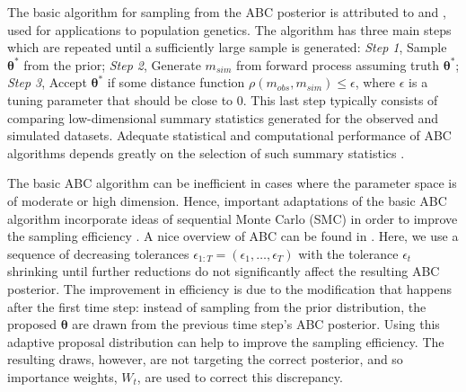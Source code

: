 \documentclass[12pt]{article}
\newcommand{\btheta}{\boldsymbol{\theta}}
\begin{document}
The basic algorithm for sampling from the ABC posterior is attributed to 
\cite{TavareEtAl1997} and \cite{PitchardEtAl1999}, used for applications to population 
genetics. The algorithm has three main steps which are repeated until a sufficiently
large sample is generated:
\emph{Step 1}, Sample $\btheta^*$ from the prior; \emph{Step 2}, 
Generate $m_{sim}$ from forward process assuming truth $\btheta^*$; 
 \emph{Step 3},  
Accept $\btheta^*$ if some distance function $\rho(m_{obs}, m_{sim}) \leq \epsilon$, where $\epsilon$ is a tuning parameter that should be close to 0.
This last step typically consists of comparing low-dimensional summary statistics generated
for the observed and simulated datasets. 
Adequate statistical and computational performance of ABC algorithms depends greatly on the
selection of such summary statistics
\citep{JoyceMarjoram2008,BlumFrancois2010, Blum2010, FearnheadPrangle2012, BlumEtAl2013}.

The basic ABC algorithm can be inefficient in cases where the parameter space is of moderate
or high dimension.
Hence, important adaptations of the basic ABC algorithm incorporate ideas of sequential Monte Carlo (SMC) in 
order to improve the sampling efficiency \citep{MarjoramEtAl2003,SissonEtAl2007,beaumont2009, DelMoralEtAl2011}.  A nice overview of ABC can be found in \cite{MarinEtAl2012}.  
Here, we use a sequence of decreasing tolerances $\epsilon_{1:T} = (\epsilon_1, \ldots, \epsilon_T)$ 
with the tolerance $\epsilon_t$ shrinking until further reductions do not significantly affect the 
resulting ABC posterior.
The improvement in efficiency is due to the modification that happens after the first time step: 
instead of sampling from the prior distribution, the proposed $\btheta$ are drawn from the previous time step's ABC posterior.  Using this adaptive proposal distribution can help to improve the sampling efficiency.  The resulting draws, however, are not targeting the correct posterior, and so importance weights, $W_t$, are used to correct this discrepancy.

\end{document}
